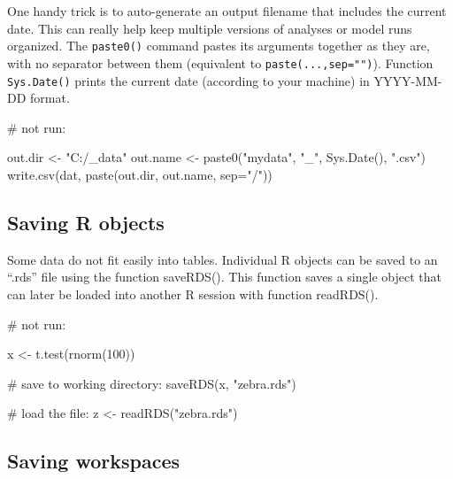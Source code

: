 \documentclass[
  13,
  letterpaper,
]{report}
\newenvironment{Shaded}{\begin{snugshade}}{\end{snugshade}}
\newcommand{\AttributeTok}[1]{\textcolor[rgb]{0.40,0.45,0.13}{#1}}
\newcommand{\CommentTok}[1]{\textcolor[rgb]{0.37,0.37,0.37}{#1}}
\newcommand{\DecValTok}[1]{\textcolor[rgb]{0.68,0.00,0.00}{#1}}
\newcommand{\FunctionTok}[1]{\textcolor[rgb]{0.28,0.35,0.67}{#1}}
\newcommand{\NormalTok}[1]{\textcolor[rgb]{0.00,0.23,0.31}{#1}}
\newcommand{\OtherTok}[1]{\textcolor[rgb]{0.00,0.23,0.31}{#1}}
\newcommand{\StringTok}[1]{\textcolor[rgb]{0.13,0.47,0.30}{#1}}
\begin{document}
One handy trick is to auto-generate an output filename that includes the
current date. This can really help keep multiple versions of analyses or
model runs organized. The \texttt{paste0()} command pastes its arguments
together as they are, with no separator between them (equivalent to
\texttt{paste(...,sep="")}). Function \texttt{Sys.Date()} prints the
current date (according to your machine) in YYYY-MM-DD format.

\begin{Shaded}
\begin{Highlighting}[]
\CommentTok{\# not run:}

\NormalTok{out.dir }\OtherTok{\textless{}{-}} \StringTok{"C:/\_data"}
\NormalTok{out.name }\OtherTok{\textless{}{-}} \FunctionTok{paste0}\NormalTok{(}\StringTok{"mydata"}\NormalTok{, }\StringTok{"\_"}\NormalTok{, }\FunctionTok{Sys.Date}\NormalTok{(), }\StringTok{".csv"}\NormalTok{)}
\FunctionTok{write.csv}\NormalTok{(dat, }\FunctionTok{paste}\NormalTok{(out.dir, out.name, }\AttributeTok{sep=}\StringTok{"/"}\NormalTok{))}
\end{Highlighting}
\end{Shaded}

\subsection{Saving R objects}\label{sec-ie-export-robj}

Some data do not fit easily into tables. Individual R objects can be
saved to an ``.rds'' file using the function saveRDS(). This function
saves a single object that can later be loaded into another R session
with function readRDS().

\begin{Shaded}
\begin{Highlighting}[]
\CommentTok{\# not run:}

\NormalTok{x }\OtherTok{\textless{}{-}} \FunctionTok{t.test}\NormalTok{(}\FunctionTok{rnorm}\NormalTok{(}\DecValTok{100}\NormalTok{))}

\CommentTok{\# save to working directory:}
\FunctionTok{saveRDS}\NormalTok{(x, }\StringTok{"zebra.rds"}\NormalTok{)}

\CommentTok{\# load the file:}
\NormalTok{z }\OtherTok{\textless{}{-}} \FunctionTok{readRDS}\NormalTok{(}\StringTok{"zebra.rds"}\NormalTok{)}
\end{Highlighting}
\end{Shaded}

\subsection{Saving workspaces}\label{sec-ie-export-rdata}
\end{document}
